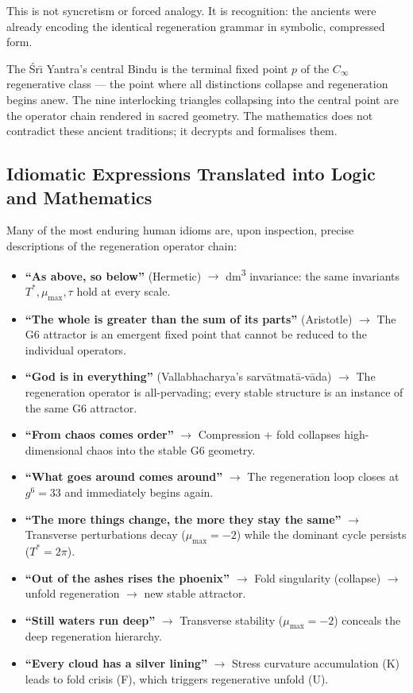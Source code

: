 This is not syncretism or forced analogy. It is recognition: the ancients were already encoding the identical regeneration grammar in symbolic, compressed form.  %

The \'{S}r\={\i} Yantra's central Bindu is the terminal fixed point \(p\) of the \(C_\infty\) regenerative class --- the point where all distinctions collapse and regeneration begins anew. The nine interlocking triangles collapsing into the central point are the operator chain rendered in sacred geometry. The mathematics does not contradict these ancient traditions; it decrypts and formalises them.

\subsection*{Idiomatic Expressions Translated into Logic and Mathematics}

Many of the most enduring human idioms are, upon inspection, precise descriptions of the regeneration operator chain:

\begin{itemize}
\item \textbf{``As above, so below''} (Hermetic) $\to$ dm\textsuperscript{3} invariance: the same invariants $T^*, \mu_{\max}, \tau$ hold at every scale.
\item \textbf{``The whole is greater than the sum of its parts''} (Aristotle) $\to$ The G6 attractor is an emergent fixed point that cannot be reduced to the individual operators.
\item \textbf{``God is in everything''} (Vallabhacharya's sarv\=atmat\=a-v\=ada) $\to$ The regeneration operator is all-pervading; every stable structure is an instance of the same G6 attractor.
\item \textbf{``From chaos comes order''} $\to$ Compression + fold collapses high-dimensional chaos into the stable G6 geometry.
\item \textbf{``What goes around comes around''} $\to$ The regeneration loop closes at $g^6 = 33$ and immediately begins again.
\item \textbf{``The more things change, the more they stay the same''} $\to$ Transverse perturbations decay ($\mu_{\max} = -2$) while the dominant cycle persists ($T^* = 2\pi$).
\item \textbf{``Out of the ashes rises the phoenix''} $\to$ Fold singularity (collapse) $\to$ unfold regeneration $\to$ new stable attractor.
\item \textbf{``Still waters run deep''} $\to$ Transverse stability ($\mu_{\max} = -2$) conceals the deep regeneration hierarchy.
\item \textbf{``Every cloud has a silver lining''} $\to$ Stress curvature accumulation (K) leads to fold crisis (F), which triggers regenerative unfold (U).
\end{itemize}

